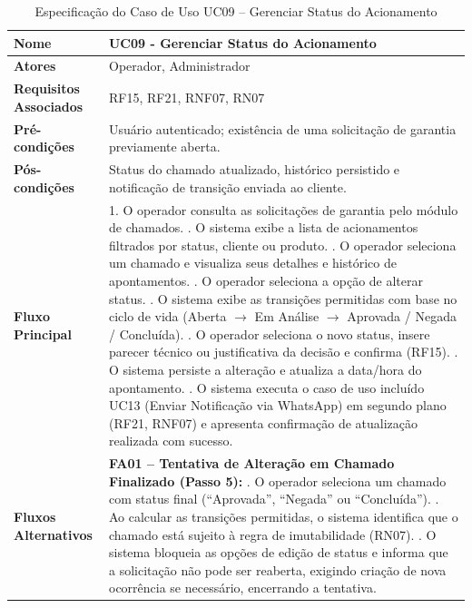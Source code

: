 \begin{table}[H]
	\centering
	\caption{Especificação do Caso de Uso UC09 – Gerenciar Status do Acionamento}
	\label{tab:uc09}
	\begin{tabular}{|p{3.5cm}|p{11.5cm}|}
		\hline
		\textbf{Nome} & UC09 - Gerenciar Status do Acionamento \\ \hline
		\textbf{Atores} & Operador, Administrador \\ \hline
		\textbf{Requisitos Associados} & RF15, RF21, RNF07, RN07 \\ \hline
		\textbf{Pré-condições} & Usuário autenticado; existência de uma solicitação de garantia previamente aberta. \\ \hline
		\textbf{Pós-condições} & Status do chamado atualizado, histórico persistido e notificação de transição enviada ao cliente. \\ \hline
		\textbf{Fluxo Principal} & 
		1. O operador consulta as solicitações de garantia pelo módulo de chamados. \newline
		2. O sistema exibe a lista de acionamentos filtrados por status, cliente ou produto. \newline
		3. O operador seleciona um chamado e visualiza seus detalhes e histórico de apontamentos. \newline
		4. O operador seleciona a opção de alterar status. \newline
		5. O sistema exibe as transições permitidas com base no ciclo de vida (Aberta $\rightarrow$ Em Análise $\rightarrow$ Aprovada / Negada / Concluída). \newline
		6. O operador seleciona o novo status, insere parecer técnico ou justificativa da decisão e confirma (RF15). \newline
		7. O sistema persiste a alteração e atualiza a data/hora do apontamento. \newline
		8. O sistema executa o caso de uso incluído UC13 (Enviar Notificação via WhatsApp) em segundo plano (RF21, RNF07) e apresenta confirmação de atualização realizada com sucesso. \\ \hline
		\textbf{Fluxos Alternativos} & 
		\textbf{FA01 – Tentativa de Alteração em Chamado Finalizado (Passo 5):} \newline
		1. O operador seleciona um chamado com status final (``Aprovada'', ``Negada'' ou ``Concluída''). \newline
		2. Ao calcular as transições permitidas, o sistema identifica que o chamado está sujeito à regra de imutabilidade (RN07). \newline
		3. O sistema bloqueia as opções de edição de status e informa que a solicitação não pode ser reaberta, exigindo criação de nova ocorrência se necessário, encerrando a tentativa. \\ \hline
	\end{tabular}
\end{table}

